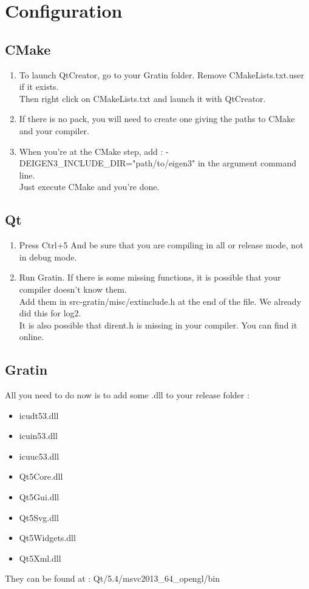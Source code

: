 \documentclass{beamer}
\begin{document}
\section{Configuration}
\subsection{CMake}
\begin{frame}
  \begin{enumerate}
    \item To launch QtCreator, go to your Gratin folder. Remove CMakeLists.txt.user if it exists.\\
Then right click on CMakeLists.txt and launch it with QtCreator.
    \item If there is no pack, you will need to create one giving the paths to CMake and your compiler.
    \item When you're at the CMake step, add : -DEIGEN3\_INCLUDE\_DIR="path/to/eigen3" in the argument command line.\\
Just execute CMake and you're done.
  \end{enumerate}
\end{frame}

\subsection{Qt}
\begin{frame}
  \begin{enumerate}
    \item Press Ctrl+5 And be sure that you are compiling in all or release mode, not in debug mode.
    \item Run Gratin. If there is some missing functions, it is possible that your compiler doesn't know them.\\
Add them in src-gratin/misc/extinclude.h at the end of the file. We already did this for log2.\\
It is also possible that dirent.h is missing in your compiler. You can find it online.
  \end{enumerate}
\end{frame}

\subsection{Gratin}
\begin{frame}
  All you need to do now is to add some .dll to your release folder :
  \begin{itemize}
    \item icudt53.dll
    \item icuin53.dll
    \item icuuc53.dll
    \item Qt5Core.dll
    \item Qt5Gui.dll
    \item Qt5Svg.dll
    \item Qt5Widgets.dll
    \item Qt5Xml.dll
  \end{itemize}
  They can be found at : Qt/5.4/msvc2013\_64\_opengl/bin
\end{frame}
\end{document}
